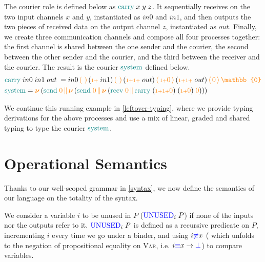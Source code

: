 \documentclass[runningheads]{llncs}
\newcommand{\type}[1]{\textcolor{blue}{\operatorname{#1}}}
\newcommand{\constr}[1]{\textcolor{orange}{\operatorname{#1}}}
\newcommand{\func}[1]{\textcolor{teal}{\operatorname{#1}}}
\newcommand{\PO}{\constr{\mathbb{0}}}
\newcommand{\comp}[2]{#1 \, \constr{\parallel} \, #2}
\newcommand{\new}{\constr{\boldsymbol{\nu}} \,}
\newcommand{\send}[2]{#1 \, \constr{\langle} \, #2 \,\constr{\rangle} \,}
\newcommand{\recv}[2]{#1 \, \constr{\mathbb{(}} \, #2 \, \constr{\mathbb{)}} \,}
\newcommand{\suc}{\constr{\scriptstyle 1+}}
\newcommand{\Unused}{\type{UNUSED}}
\begin{document}
\begin{example}
The courier role is defined below as $\func{carry} \; x \; y \; z$.
It sequentially receives on the two input channels $x$ and $y$, instantiated as $in0$ and $in1$, and then outputs the two pieces of received data on the output channel $z$, instantiated as $out$.
Finally, we create three communication channels and compose all four processes together: the first channel is shared between the one sender and the courier, the second between the other sender and the courier, and the third between the receiver  and the courier.
The result is the courier $\func{system}$ defined below.
\begin{align*}
  & \func{carry} \; in0 \; in1 \; out \; =  \recv{in0 }{} 
  \recv{(\suc \; in1) }{} 
  \send{(\suc \suc \; out) }{\suc \constr{0}} 
  \send{(\suc \suc \; out) }{\constr{0}} \PO \\
  & \func{system} =  \new{} ( \func{send} \; \constr{0} 
  \comp{}{\new{} ( \func{send} \; \constr{0} } 
  \comp{}{\new{} ( \func{recv} \; \constr{0} } 
  \comp{}{\func{carry} \; (\suc \suc \constr{0}) \; (\suc \constr{0}) \; \constr{0}))) } 
\end{align*}

We continue this running example in  \autoref{leftover-typing}, where we provide typing derivations for the above processes and use a mix of linear, graded and shared typing to type the courier $\func{system}$.
\end{example}

\section{Operational Semantics}
\label{semantics}
Thanks to our well-scoped grammar in \autoref{syntax}, we now define the semantics of our language on the totality of the syntax.

\begin{nidefinition} \label{def:unused}
  We consider a variable $i$ to be unused in $P$ ($\Unused_i \; P$) if none of the inputs nor the outputs refer to it.
  $\Unused_i \; P$ is defined as a recursive predicate on $P$, incrementing $i$ every time we go under a binder, and using $i \type{\not\equiv} x$ ( which unfolds to the negation of propositional equality on \textsc{Var}, i.e. $i \type{\equiv} x \to \type{\bot}$) to compare variables.
\end{nidefinition}
\end{document}
